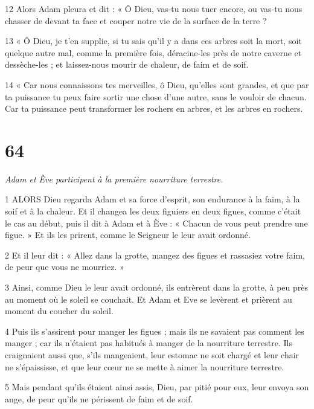 \par 12 Alors Adam pleura et dit : « Ô Dieu, vas-tu nous tuer encore, ou vas-tu nous chasser de devant ta face et couper notre vie de la surface de la terre ?

\par 13 « Ô Dieu, je t'en supplie, si tu sais qu'il y a dans ces arbres soit la mort, soit quelque autre mal, comme la première fois, déracine-les près de notre caverne et dessèche-les ; et laissez-nous mourir de chaleur, de faim et de soif.

\par 14 « Car nous connaissons tes merveilles, ô Dieu, qu'elles sont grandes, et que par ta puissance tu peux faire sortir une chose d'une autre, sans le vouloir de chacun. Car ta puissance peut transformer les rochers en arbres, et les arbres en rochers.

\chapter{64}

\par \textit{Adam et Ève participent à la première nourriture terrestre.}

\par 1 ALORS Dieu regarda Adam et sa force d'esprit, son endurance à la faim, à la soif et à la chaleur. Et il changea les deux figuiers en deux figues, comme c'était le cas au début, puis il dit à Adam et à Ève : « Chacun de vous peut prendre une figue. » Et ils les prirent, comme le Seigneur le leur avait ordonné.

\par 2 Et il leur dit : « Allez dans la grotte, mangez des figues et rassasiez votre faim, de peur que vous ne mourriez. »

\par 3 Ainsi, comme Dieu le leur avait ordonné, ils entrèrent dans la grotte, à peu près au moment où le soleil se couchait. Et Adam et Eve se levèrent et prièrent au moment du coucher du soleil.

\par 4 Puis ils s'assirent pour manger les figues ; mais ils ne savaient pas comment les manger ; car ils n'étaient pas habitués à manger de la nourriture terrestre. Ils craignaient aussi que, s'ils mangeaient, leur estomac ne soit chargé et leur chair ne s'épaississe, et que leur cœur ne se mette à aimer la nourriture terrestre.

\par 5 Mais pendant qu'ils étaient ainsi assis, Dieu, par pitié pour eux, leur envoya son ange, de peur qu'ils ne périssent de faim et de soif.

